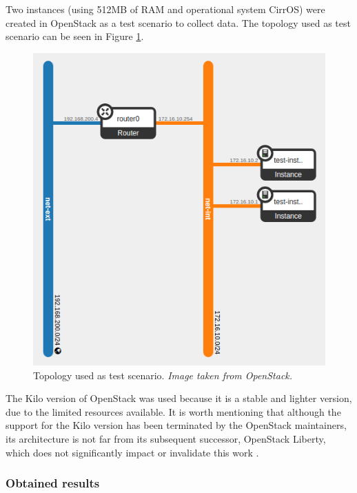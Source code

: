 \documentclass[conference]{IEEEtran}
\begin{document}
	
	Two instances (using 512MB of RAM and operational system CirrOS) were created in OpenStack as a test scenario to collect data.
	The topology used as test scenario can be seen in Figure \ref{fig:instancias}.
	 
	\begin{figure}[ht]
	\centering
	\includegraphics[width=.4\textwidth]{figuras/topologia_teste.png}
	\caption{Topology used as test scenario. {\tiny \textit{Image taken from OpenStack.}}}
	\label{fig:instancias}
	\end{figure}
	
	
	The Kilo \cite{openstack_kilo} version of OpenStack was used because it is a stable and lighter version,
	due to the limited resources available.
	It is worth mentioning that although the support for the Kilo version has been terminated by the OpenStack maintainers,
	its architecture is not far from its subsequent successor, OpenStack Liberty, which does not significantly impact
	or invalidate this work \cite{openstack_liberty}.
		    
    \subsubsection{Obtained results} \label{resultados_levantamento}
  
\end{document}
